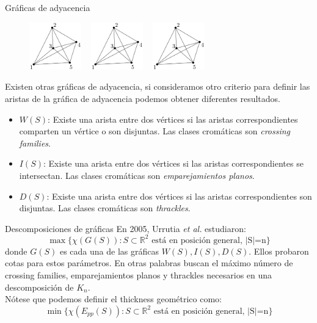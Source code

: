 \begin{frame}{Gráficas de adyacencia}
	\begin{figure}
		\centering
		\includegraphics[width=0.2\textwidth]{images/K5}%
		~\vrule
		\includegraphics[width=0.2\textwidth]{images/K5}%
		~\vrule
		\includegraphics[width=0.2\textwidth]{images/K5}%
	\end{figure}
	Existen otras gráficas de adyacencia, si consideramos otro criterio para definir las aristas de la gráfica de adyacencia podemos obtener diferentes resultados.
	\begin{itemize}
		\item $W(S)$: Existe una arista entre dos vértices si las aristas correspondientes comparten un vértice o son disjuntas. Las clases cromáticas son \emph{crossing families}.
		\item $I(S)$: Existe una arista entre dos vértices si las aristas correspondientes se intersectan. Las clases cromáticas son \emph{emparejamientos planos}.
		\item $D(S)$: Existe una arista entre dos vértices si las aristas correspondientes son disjuntas. Las clases cromáticas son \emph{thrackles}.
	\end{itemize}
\end{frame}
\begin{frame}{Descomposiciones de gráficas}
		En 2005, Urrutia \emph{et al.} estudiaron: \[\max\{\chi(G(S)): S \subset \mathbb{R}^2 \text{ está en posición general, |S|=n} \}\] donde $G(S)$ es cada una de las gráficas $W(S),I(S),D(S)$. Ellos probaron cotas para estos parámetros. En otras palabras buscan el máximo número de crossing families, emparejamientos planos y thrackles necesarios en una descomposición de $K_n$.
		\pause
		\\[6pt]
		Nótese que podemos definir el thickness geométrico como:
		\[ \min\{ \chi(E_{pp}(S)) : S \subset \mathbb{R}^2 \text{ está en posición general, |S|=n}\} \]
\end{frame}

